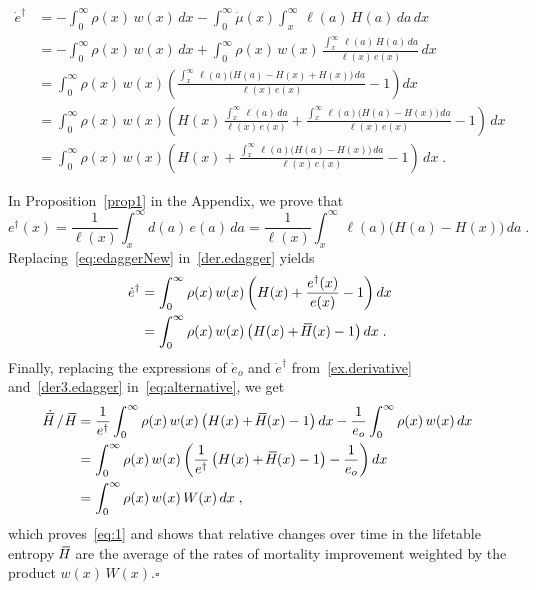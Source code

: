 \documentclass[a4paper,twoside, openright, 12pt, leqno]{article}
\newcommand*\xbar[1]{%
   \hbox{%
     \vbox{%
       \hrule height 0.5pt %
       \kern0.3ex%
       \hbox{%
         \kern-0.28em%
         \ensuremath{#1}%
         \kern-0.05em%
       }%
     }%
   }%
}
\begin{document}
\begin{equation}
 \begin{split}
 \dot{e}^\dagger	
    & = -\int_0^\infty\rho(x)\,w(x)\,dx-\int_0^\infty\dot{\mu}(x)\int_x^\infty\,\ell(a)\,H(a)\,da\,dx    \\
    & = -\int_0^\infty\rho(x)\,w(x)\,dx+\int_0^\infty\rho(x)\,w(x)\,\frac{\int_x^\infty\,\ell(a)\,H(a)\,da}{\ell(x)\,e(x)}\,dx                                   \\
    & =\int_0^\infty\rho(x)\,w(x)\left(\frac{\int_x^\infty\,\ell(a)\big(H(a)-H(x)+H(x)\big)\,da}{\ell(x)\,e(x)}-1\right)dx                  \\
    & =\int_0^\infty\rho(x)\,w(x)\left(H(x)\,\frac{\int_x^\infty\,\ell(a)\,da}{\ell(x)\,e(x)}+\frac{\int_x^\infty\,\ell(a)\big(H(a)-H(x)\big)\,da}{\ell(x)\,e(x)}-1\right)\,dx                                           \\
    & =\int_0^\infty\rho(x)\,w(x)\left(H(x)+\frac{\int_x^\infty\,\ell(a)\big(H(a)-H(x)\big)\,da}{\ell(x)\,e(x)}-1\right)\,dx\;.
 \label{der.edagger}
 \end{split}
\end{equation}

In Proposition~\ref{prop1} in the Appendix, we prove that
%
\begin{equation}
e^\dagger(x)=\frac{1}{\ell(x)}\int_x^\infty d(a)\,e(a)\,da=\frac{1}{\ell(x)}\int_x^\infty\,\ell(a)\big(H(a)-H(x)\big)\,da\;.
\label{eq:edaggerNew}
\end{equation}
%
Replacing~\eqref{eq:edaggerNew} in~\eqref{der.edagger} yields
%
\begin{equation}
  \begin{split}
    \dot{e}^\dagger
        & = \int_0^\infty\rho(x)\,w(x)\left(H(x)+\frac{e^\dagger(x)}{e(x)}-1\right)dx                 \\
        & = \int_0^\infty\rho(x)\,w(x)\,\big(H(x)+\,\xbar{H}(x)-1\big)\,dx   \;.
  \end{split}
  \label{der3.edagger}
\end{equation}
%
Finally, replacing the expressions of $\dot{e}_o$ and $\dot{e}^\dagger$ from~\eqref{ex.derivative} and~\eqref{der3.edagger} in~\eqref{eq:alternative}, we get 
%
\begin{equation*}
 \begin{split}
    \dot{\xbar{H}}\,/\,\,\xbar{H}
        & = \frac{1}{e^\dagger}\int_0^\infty\rho(x)\,w(x)\left(H(x)+\,\xbar{H}(x)-1\right)dx-\frac{1}{e_o}\int_0^\infty\rho(x)\,w(x)\,dx    \\
        & = \int_0^\infty\rho(x)\,w(x)\left(\frac{1}{e^\dagger}\left(H(x)+\,\xbar{H}(x)-1\right)-\frac{1}{e_o}\right)dx                               \\
        & = \int_0^\infty\rho(x)\,w(x)\,W(x)\,dx\;,
 \end{split}
\end{equation*}
%
which proves~\eqref{eq:1} and shows that relative changes over time in the lifetable entropy $\,\xbar{H}$ are the average of the rates of mortality improvement weighted by the product $w(x)\,W(x)$.\hfill$\square$
\end{document}
